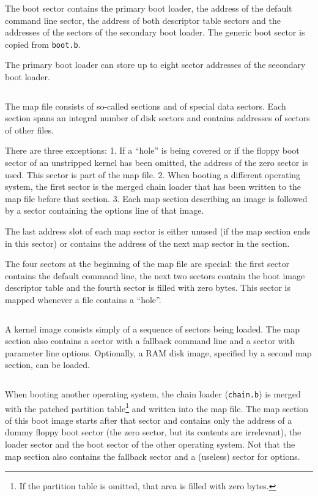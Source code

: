 $$
  
$$

The boot sector contains the primary boot loader, the address of the default
command line sector, the address of both
descriptor table sectors and the addresses of the sectors of the secondary
boot loader. The generic boot sector is copied from {\tt boot.b}.

The primary boot loader can store up to eight sector addresses of the
secondary boot loader.

$$
  
$$

The map file consists of so-called sections and of special data sectors.
Each section
spans an integral number of disk sectors and contains addresses of sectors
of other files.

There are three exceptions: 1. If a ``hole'' is being
covered or if the floppy boot sector of an unstripped kernel has been omitted,
the address of the zero sector is used. This sector is part of the
map file. 2. When booting a different operating system, the first sector is
the merged chain loader that has been written to the map file before that
section. 3. Each map section describing an image is followed by a sector
containing the options line of that image.

The last address slot of each map sector is either unused (if the map section
ends in this sector) or contains the address of the next map sector in the
section.

The four sectors at the beginning of the map file are special: the first
sector contains the default command line, the next
two sectors contain the boot image descriptor table and the fourth sector
is filled with zero bytes. This sector is mapped whenever a file contains
a ``hole''.

$$
  
$$

A kernel image consists simply of a sequence of sectors being
loaded. The map section also contains a sector with a fallback command line
and a sector with parameter line options. Optionally, a RAM disk image,
specified by a second map section, can be loaded.

$$
  
$$

When booting another operating system, the chain loader ({\tt chain.b}) is
merged with the patched partition table\footnote{If the partition table is
omitted, that area is filled with zero bytes.} and written into the map file.
The map section of this boot image starts after that sector and contains only
the address of a dummy floppy boot sector (the zero sector, but its
contents are irrelevant), the loader
sector and the boot sector of the other operating system. Not that the
map section also contains the fallback sector and a (useless) sector for
options.


